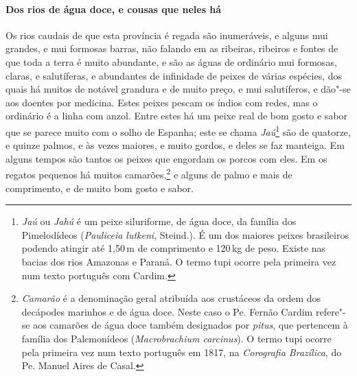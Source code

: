 \begin{linenumbers}
\paragraph{Dos rios de água doce, e cousas que neles há}\quad
 Os rios caudais de que esta província é regada são inumeráveis, e
alguns mui grandes, e mui formosas barras, não falando em as ribeiras,
ribeiros e fontes de que toda a terra é muito abundante, e são as águas
de ordinário mui formosas, claras, e salutíferas, e abundantes de
infinidade de peixes de várias espécies, dos quais há muitos de notável
grandura e de muito preço, e mui salutíferos, e dão"-se aos doentes por
medicina. Estes peixes pescam os índios com redes, mas o ordinário é a
linha com anzol. Entre estes há um peixe real de bom gosto e sabor que
se parece muito com o solho de Espanha; este se chama 
\textit{Jaú}\footnote{ \textit{Jaú} ou \textit{Jahú} é um peixe siluriforme,
de água doce, da família dos Pimelodídeos (\textit{Pauliceia lutkeni}, Steind.). 
É um dos maiores peixes brasileiros podendo atingir até
1,50\,m de comprimento e 120\,kg de peso. Existe nas bacias dos rios
Amazonas e Paraná. O termo tupi ocorre pela primeira vez num texto
português com Cardim.} são de quatorze, e quinze palmos, e às vezes
maiores, e muito gordos, e deles se faz manteiga. Em alguns tempos são
tantos os peixes que engordam os porcos com eles. Em os regatos
pequenos há muitos camarões,\footnote{ \textit{Camarão} é a
denominação geral atribuída aos crustáceos da ordem dos decápodes
marinhos e de água doce. Neste caso o Pe. Fernão Cardim refere"-se aos
camarões de água doce também designados por \textit{pitus}, que
pertencem à família dos Palemonídeos (\textit{Macrobrachium carcinus}). 
O termo tupi ocorre pela primeira vez num texto português em 1817, na
\textit{Corografia Brazílica}, do Pe. Manuel Aires de Casal.} e alguns
de palmo e mais de comprimento, e de muito bom gosto e sabor.


\end{linenumbers}

